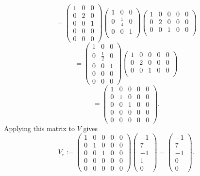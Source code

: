 \documentclass[12pt]{article}
\def\bv{\left(\begin{array}{c}}
\def\ev{\end{array}\right) }
\begin{document}
\[= 
\left( \begin{array}{rrr}
1 &0&0\\
0      &2&0\\
0&0&1\\
0&0&0\\
0&0&0
\end{array} \right)
\left( \begin{array}{rrr}
1 &0&0\\
0      &\frac14&0\\
0&0&1\\
\end{array} \right)
\left( \begin{array}{rrrrr}
1 &0&0&0&0\\
0      &2&0&0&0\\
0&0&1&0&0\\
\end{array} \right)
\]
\[= 
\left( \begin{array}{rrr}
1 &0&0\\
0      &\frac12&0\\
0&0&1\\
0&0&0\\
0&0&0
\end{array} \right)
\left( \begin{array}{rrrrr}
1 &0&0&0&0\\
0      &2&0&0&0\\
0&0&1&0&0\\
\end{array} \right)
\]
\[= 
\left( \begin{array}{rrrrr}
1 &0&0&0&0\\
0      &1&0&0&0\\
0&0&1&0&0\\
0&0&0&0&0\\
0&0&0&0&0
\end{array} \right).
\]
Applying this matrix to $V$ gives 
\[
V_r:=\left( \begin{array}{rrrrr}
1 &0&0&0&0\\
0      &1&0&0&0\\
0&0&1&0&0\\
0&0&0&0&0\\
0&0&0&0&0
\end{array} \right) 
\bv -1\\7\\-1\\1\\0 \ev 
=
\bv -1\\7\\-1\\0\\0 \ev.
\]
\end{document}
